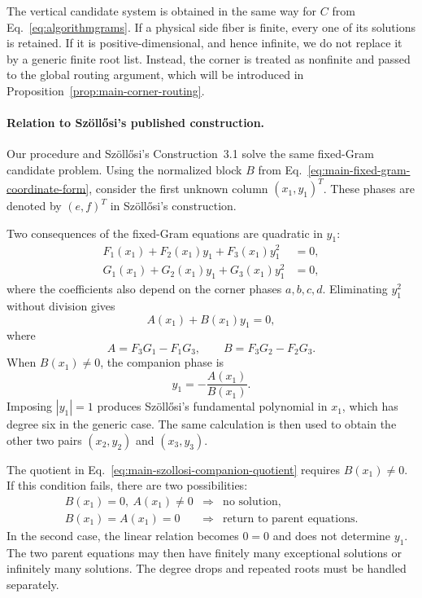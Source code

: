 \documentclass[aps,prx,reprint,nofootinbib,twoside,superscriptaddress,longbibliography,floatfix]{revtex4-2}
\theoremstyle{definition}
\begin{document}
The vertical candidate system is obtained in the same way for $C$ from Eq.~\ref{eq:algorithmgrams}. If a physical side fiber is finite, every one of its solutions is retained. If it is positive-dimensional, and hence infinite, we do not replace it by a generic finite root list. Instead, the corner is treated as nonfinite and passed to the global routing argument, which will be introduced in Proposition~\ref{prop:main-corner-routing}.

\paragraph*{Relation to Sz\"oll\H{o}si's published construction.}
Our procedure and Sz\"oll\H{o}si's Construction~3.1
\cite{Szollosi2012FourParameter} solve the same fixed-Gram candidate problem. Using the normalized block $B$ from Eq.~\eqref{eq:main-fixed-gram-coordinate-form}, consider the first unknown column $(x_1,y_1)^T$. These phases are denoted by $(e,f)^T$ in Sz\"oll\H{o}si's construction.

Two consequences of the fixed-Gram equations are quadratic in $y_1$:
\begin{equation}
\begin{aligned}
F_1(x_1)+F_2(x_1)y_1+F_3(x_1)y_1^2&=0,\\
G_1(x_1)+G_2(x_1)y_1+G_3(x_1)y_1^2&=0,
\end{aligned}
\label{eq:main-szollosi-parent-quadratics}
\end{equation}
where the coefficients also depend on the corner phases $a,b,c,d$.
Eliminating $y_1^2$ without division gives
\begin{equation}
A(x_1)+B(x_1)y_1=0,
\label{eq:main-szollosi-companion-relation}
\end{equation}
where
\begin{equation}
A=F_3G_1-F_1G_3,
\qquad
B=F_3G_2-F_2G_3.
\end{equation}
When $B(x_1)\neq0$, the companion phase is
\begin{equation}
y_1=-\frac{A(x_1)}{B(x_1)}.
\label{eq:main-szollosi-companion-quotient}
\end{equation}
Imposing $|y_1|=1$ produces Sz\"oll\H{o}si's fundamental polynomial in $x_1$, which has degree six in the generic case. The same calculation is then used to obtain the other two pairs $(x_2,y_2)$ and $(x_3,y_3)$.

The quotient in Eq.~\eqref{eq:main-szollosi-companion-quotient} requires
$B(x_1)\neq0$. If this condition fails, there are two possibilities:
\begin{equation}
\begin{array}{rcl}
B(x_1)=0,\ A(x_1)\neq0
&\Longrightarrow& \text{no solution},\\[2pt]
B(x_1)=A(x_1)=0
&\Longrightarrow& \text{return to parent equations.}
\end{array}
\label{eq:main-szollosi-companion-cases}
\end{equation}
In the second case, the linear relation becomes $0=0$ and does not determine $y_1$. The two parent equations may then have finitely many exceptional solutions or infinitely many solutions. The degree drops and repeated roots must be handled separately.
\end{document}
